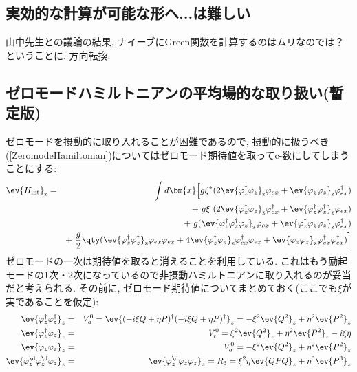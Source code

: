 \documentclass[10.5pt,a4paper]{jreport}
\begin{document}
\subsection{実効的な計算が可能な形へ...は難しい}
山中先生との議論の結果, ナイーブにGreen関数を計算するのはムリなのでは？ということに. 方向転換. 
\subsection{ゼロモードハミルトニアンの平均場的な取り扱い(暫定版)}
ゼロモードを摂動的に取り入れることが困難であるので, 摂動的に扱うべき(\ref{ZeromodeHamiltonian})についてはゼロモード期待値を取ってc-数にしてしまうことにする:
\begin{eqnarray}
  \nonumber  \ev{H_{\rm int}}_{\rm z} &=& \int d\bm{x} \Bigl[g\xi^*(2\ev{\varphi_z^\dagger\varphi_z}_{\rm z}\varphi_{ex} + \ev{\varphi_z\varphi_z}_{\rm z}\varphi_{ex}^\dagger)\\
    \nonumber  && +\ g\xi\ (2\ev{\varphi_z^\dagger\varphi_z}_{\rm z}\varphi_{ex}^\dagger + \ev{\varphi_z^\dagger\varphi_z^\dagger}_{\rm z}\varphi_{ex})\\
    \nonumber  && +\ g(\ev{\varphi^\dagger_z\varphi^\dagger_z\varphi_z}_{\rm z}\varphi_{ex} + \ev{\varphi^\dagger_z\varphi_z\varphi_z}_{\rm z}\varphi^\dagger_{ex}) \\
    && +\ \frac{g}{2}\qty(\ev{\varphi^\dagger_z \varphi^\dagger_z}_{\rm z} \varphi_{ex}\varphi_{ex} + 4\ev{\varphi^\dagger_z \varphi_z}_{\rm z} \varphi^\dagger_{ex}\varphi_{ex} + \ev{\varphi_z \varphi_z}_{\rm z} \varphi^\dagger_{ex}\varphi^\dagger_{ex})\Bigr]\label{ZeromodeHamiltonian2}
\end{eqnarray}
ゼロモードの一次は期待値を取ると消えることを利用している. これはもう励起モードの1次・2次になっているので非摂動ハミルトニアンに取り入れるのが妥当だと考えられる. その前に, ゼロモード期待値についてまとめておく(ここでも$\xi$が実であることを仮定):
\begin{eqnarray}
  \nonumber  \ev{\varphi^\dagger_z\varphi^\dagger_z}_z &=& V_a^0 = \ev{(-i\xi Q + \eta P)^\dagger(-i\xi Q + \eta P)^\dagger}_z = -\xi^2\ev{Q^2}_z + \eta^2\ev{P^2}_z\\
  \nonumber \ev{\varphi_z^\dagger\varphi_z}_z &=&  V_t^0 = \xi^2\ev{Q^2}_z + \eta^2\ev{P^2}_z - i\xi\eta\\
  \nonumber \ev{\varphi_z\varphi_z}_z &=& V_a^0 =  -\xi^2\ev{Q^2}_z + \eta^2\ev{P^2}_z\\
  \ev{\varphi_z^\d\varphi_z^\d\varphi_z}_z &=& \ev{\varphi_z^\d\varphi_z\varphi_z}_z = R_3 = \xi^2\eta \ev{QPQ}_z + \eta^3\ev{P^3}_z\label{Zeromode-Exp2}
\end{eqnarray}
\end{document}

